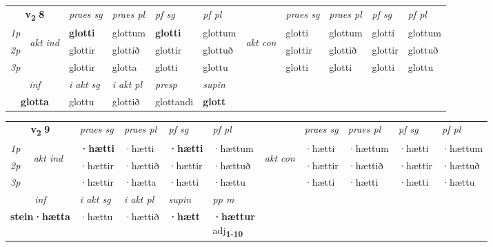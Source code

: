 \noindent
\begin{tabular}{lllllllllll} \toprule
\multicolumn{2}{c}{\textbf{v{\textsubscript{2}}} \Large{\textbf{8}}}  &  \textit{praes sg}  & \textit{praes pl}  &\textit{ pf sg} & \textit{pf pl} &  &  \textit{praes sg}  & \textit{praes pl}  & \textit{pf sg} & \textit{pf pl } \\*
	\cmidrule{3-6} \cmidrule{8-11}
 {\textit{1p}} & \multirow{3}{*}{\begin{turn}{90}\textit{akt ind}\end{turn}} & \textbf{glotti} & glottum & \textbf{glotti} & glottum & \multirow{3}{*}{\begin{turn}{90}\textit{akt con}\end{turn}} &glotti & glottum & glotti & glottum\\*
 {\textit{2p}} &  &  glottir  & glottið & glottir & glottuð & & glottir & glottið & glottir & glottuð \\*
{\textit{3p}} &  & glottir & glotta & glotti & glottu & & glotti & glotti& glotti & glottu \\*
\cmidrule{3-6} \cmidrule{8-11}

   \multicolumn{2}{c}{\textit{inf}}  & \textit{i akt sg} & \textit{i akt pl}   & \textit{presp} & \textit{supin}   \\*
  \multicolumn{2}{c}{\textbf{glotta}} & glottu  & glottið   & glottandi &  \textbf{glott}   \\*
\end{tabular}

\noindent
\begin{tabular}{lllllllllll} \toprule
\multicolumn{2}{c}{\textbf{v{\textsubscript{2}}} \Large{\textbf{9}}}  &  \textit{praes sg}  & \textit{praes pl}  &\textit{ pf sg} & \textit{pf pl} &  &  \textit{praes sg}  & \textit{praes pl}  & \textit{pf sg} & \textit{pf pl } \\*
	\cmidrule{3-6} \cmidrule{8-11}
 {\textit{1p}} & \multirow{3}{*}{\begin{turn}{90}\textit{akt ind}\end{turn}} & \textbf{·hætti} & ·hætti & \textbf{·hætti} & ·hættum & \multirow{3}{*}{\begin{turn}{90}\textit{akt con}\end{turn}} &·hætti & ·hættum & ·hætti & ·hættum\\*
 {\textit{2p}} &  &  ·hættir  & ·hættið & ·hættir & ·hættuð & & ·hættir & ·hættið & ·hættir & ·hættuð \\*
{\textit{3p}} &  & ·hættir & ·hætta & ·hætti & ·hættu & & ·hætti & ·hætti& ·hætti & ·hættu \\*
\cmidrule{3-6} \cmidrule{8-11}

   \multicolumn{2}{c}{\textit{inf}}  & \textit{i akt sg} & \textit{i akt pl}    & \textit{supin}  & \textit{pp m} \\*
  \multicolumn{2}{c}{\textbf{stein\allowbreak ·hætta}} & ·hættu  & ·hættið    &  \textbf{·hætt}  & \specialcell{\textbf{·hættur} \\ adj\textbf{\textsubscript{1-10}}} \\*
\end{tabular}


